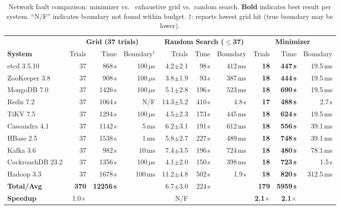 \begin{table}[t]
\centering
\caption{Network fault comparison: \system{} minimizer vs.\ \xinda{} exhaustive grid vs.\ random search.
\textbf{Bold} indicates best result per system. ``N/F'' indicates boundary not found within budget.
$\dagger$: \xinda{} reports lowest grid hit (true boundary may be lower).}
\label{tab:nw-comparison}
\small
\begin{tabular}{@{}l rrr rrr rrr@{}}
\toprule
& \multicolumn{3}{c}{\textbf{\xinda{} Grid (37 trials)}} & \multicolumn{3}{c}{\textbf{Random Search ($\leq$37)}} & \multicolumn{3}{c}{\textbf{\system{} Minimizer}} \\
\cmidrule(lr){2-4} \cmidrule(lr){5-7} \cmidrule(lr){8-10}
\textbf{System} & Trials & Time & Boundary$^\dagger$ & Trials & Time & Boundary & Trials & Time & Boundary \\
\midrule
etcd 3.5.10        & 37 & 868\,s  & 100\,$\mu$s & 4.2$\pm$2.1  & 98\,s   & 412\,ms  & \textbf{18} & \textbf{447\,s}  & 19.5\,ms \\
ZooKeeper 3.8      & 37 & 908\,s  & 100\,$\mu$s & 3.8$\pm$1.9  & 93\,s   & 387\,ms  & \textbf{18} & \textbf{444\,s}  & 19.5\,ms \\
MongoDB 7.0        & 37 & 1426\,s & 100\,$\mu$s & 5.1$\pm$2.8  & 196\,s  & 523\,ms  & \textbf{18} & \textbf{690\,s}  & 19.5\,ms \\
Redis 7.2          & 37 & 1064\,s & N/F         & 14.3$\pm$5.2 & 410\,s  & 4.8\,s   & \textbf{17} & \textbf{488\,s}  & 2.7\,s \\
TiKV 7.5           & 37 & 1294\,s & 100\,$\mu$s & 4.5$\pm$2.3  & 173\,s  & 445\,ms  & \textbf{18} & \textbf{624\,s}  & 19.5\,ms \\
Cassandra 4.1      & 37 & 1142\,s & 5\,ms       & 6.2$\pm$3.1  & 191\,s  & 612\,ms  & \textbf{18} & \textbf{556\,s}  & 39.1\,ms \\
HBase 2.5          & 37 & 1538\,s & 1\,ms       & 5.8$\pm$2.7  & 227\,s  & 489\,ms  & \textbf{18} & \textbf{748\,s}  & 39.1\,ms \\
Kafka 3.6          & 37 & 982\,s  & 10\,ms      & 7.4$\pm$3.5  & 196\,s  & 724\,ms  & \textbf{18} & \textbf{480\,s}  & 78.1\,ms \\
CockroachDB 23.2   & 37 & 1356\,s & 100\,$\mu$s & 4.1$\pm$2.0  & 150\,s  & 398\,ms  & \textbf{18} & \textbf{723\,s}  & 1.5\,s \\
Hadoop 3.3         & 37 & 1678\,s & 100\,ms     & 11.2$\pm$4.8 & 502\,s  & 1.9\,s   & \textbf{18} & \textbf{820\,s}  & 312.5\,ms \\
\midrule
\textbf{Total/Avg} & \textbf{370} & \textbf{12256\,s} & & 6.7$\pm$3.0 & 224\,s & & \textbf{179} & \textbf{5959\,s} & \\
\textbf{Speedup}   & 1.0$\times$ & & & N/F & & & \textbf{2.1$\times$} & \textbf{2.1$\times$} & \\
\bottomrule
\end{tabular}
\end{table}


